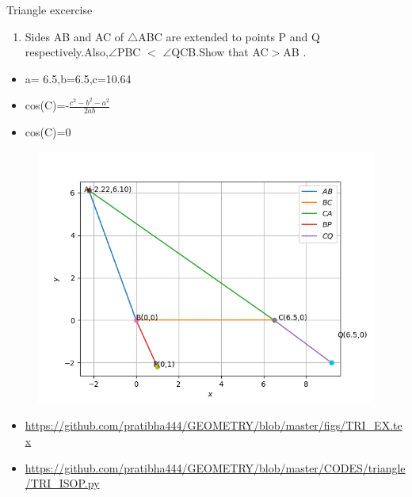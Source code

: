 \begin{frame}{Triangle excercise}
\begin{enumerate}
\item Sides AB and AC of $\triangle$ABC are extended to points P and Q respectively.Also,$\angle$PBC $<$ $\angle$QCB.Show that AC$>$AB .
\begin{center}

\end{center}
\end{enumerate}
\end{frame}
\begin{frame}
\begin{itemize}
\item a= 6.5,b=6.5,c=10.64
\item cos(C)=-$\frac{c^2 - b^2 -a^2}{2ab}$
\item cos(C)=0

\seti
\end{itemize}
\end{frame}
\begin{frame}
\begin{center}
\begin{figure}
\includegraphics[scale=.4]{./CODES/triangle/NEWTRI.png}
\end{figure}
\end{center}
\begin{itemize}
\item \url{https://github.com/pratibha444/GEOMETRY/blob/master/figs/TRI_EX.tex}
\item \url{https://github.com/pratibha444/GEOMETRY/blob/master/CODES/triangle/TRI_ISOP.py}
\end{itemize}
\end{frame}



